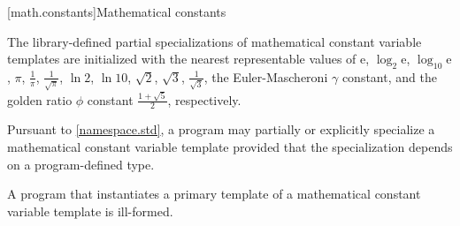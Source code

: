 [math.constants]{Mathematical constants}

\pnum
The library-defined partial specializations
of mathematical constant variable templates
are initialized with the nearest representable values of
$\mathrm{e}$,
$\log_{2} \mathrm{e}$,
$\log_{10} \mathrm{e}$,
$\pi$,
$\frac{1}{\pi}$,
$\frac{1}{\sqrt{\pi}}$,
$\ln 2$,
$\ln 10$,
$\sqrt{2}$,
$\sqrt{3}$,
$\frac{1}{\sqrt{3}}$,
the Euler-Mascheroni $\gamma$ constant, and
the golden ratio $\phi$ constant $\frac{1+\sqrt{5}}{2}$,
respectively.

\pnum
Pursuant to \ref{namespace.std},
a program may partially or explicitly specialize
a mathematical constant variable template
provided that the specialization depends on a program-defined type.

\pnum
A program that instantiates a primary template
of a mathematical constant variable template is ill-formed.
